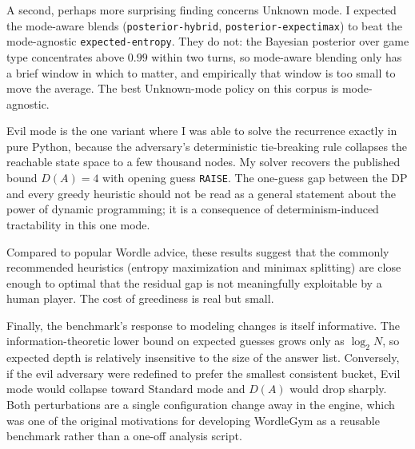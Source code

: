 \documentclass[11pt]{article}
\begin{document}
A second, perhaps more surprising finding concerns Unknown mode. I
expected the mode-aware blends (\texttt{posterior-hybrid},
\texttt{posterior-expectimax}) to beat the mode-agnostic
\texttt{expected-entropy}. They do not: the Bayesian posterior over
game type concentrates above $0.99$ within two turns, so mode-aware
blending only has a brief window in which to matter, and empirically
that window is too small to move the average. The best Unknown-mode
policy on this corpus is mode-agnostic.

Evil mode is the one variant where I was able to solve the recurrence
exactly in pure Python, because the adversary's deterministic
tie-breaking rule collapses the reachable state space to a few
thousand nodes. My solver recovers the published bound $D(A) = 4$
with opening guess \texttt{RAISE}. The one-guess gap between the DP
and every greedy heuristic should not be read as a general statement
about the power of dynamic programming; it is a consequence of
determinism-induced tractability in this one mode.

Compared to popular Wordle advice, these results suggest that the
commonly recommended heuristics (entropy maximization and minimax
splitting) are close enough to optimal that the residual gap is not
meaningfully exploitable by a human player. The cost of greediness is
real but small.

Finally, the benchmark's response to modeling changes is itself
informative. The information-theoretic lower bound on expected guesses
grows only as $\log_2 N$, so expected depth is relatively insensitive
to the size of the answer list. Conversely, if the evil adversary were
redefined to prefer the smallest consistent bucket, Evil mode would
collapse toward Standard mode and $D(A)$ would drop sharply. Both
perturbations are a single configuration change away in the engine,
which was one of the original motivations for developing WordleGym as
a reusable benchmark rather than a one-off analysis script.


\renewcommand{\refname}{References}
\end{document}
